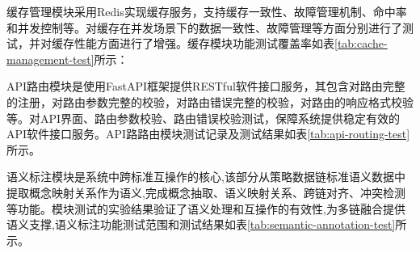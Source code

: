 缓存管理模块采用Redis实现缓存服务，支持缓存一致性、故障管理机制、命中率和并发控制等。对缓存在并发场景下的数据一致性、故障管理等方面分别进行了测试，并对缓存性能方面进行了增强。缓存模块功能测试覆盖率如表\ref{tab:cache-management-test}所示：

\begin{table}[H]
\centering
\caption{缓存管理模块单元测试结果}
\label{tab:cache-management-test}
\end{table}

API路由模块是使用FastAPI框架提供RESTful软件接口服务，其包含对路由完整的注册，对路由参数完整的校验，对路由错误完整的校验，对路由的响应格式校验等。对API界面、路由参数校验、路由错误校验测试，保障系统提供稳定有效的API软件接口服务。API路路由模块测试记录及测试结果如表\ref{tab:api-routing-test}所示。

\begin{table}[H]
\centering
\caption{API路由模块单元测试结果}
\label{tab:api-routing-test}
\end{table}

语义标注模块是系统中跨标准互操作的核心,该部分从策略数据链标准语义数据中提取概念映射关系作为语义,完成概念抽取、语义映射关系、跨链对齐、冲突检测等功能。模块测试的实验结果验证了语义处理和互操作的有效性,为多链融合提供语义支撑,语义标注功能测试范围和测试结果如表\ref{tab:semantic-annotation-test}所示。


